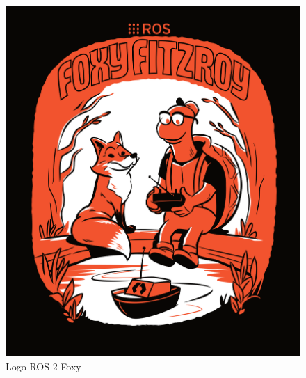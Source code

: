 \begin{figure}[ht!]
	\centering
	\begin{minipage}{0.35\linewidth}
		\centering
		\includegraphics[width=\linewidth]{figs/foxy.png}
		\caption*{\centering Logo ROS 2 Foxy} %
	\end{minipage}
	\hspace{2cm}
	\begin{minipage}{0.35\linewidth}
		\centering

\end{minipage}
\end{figure}
